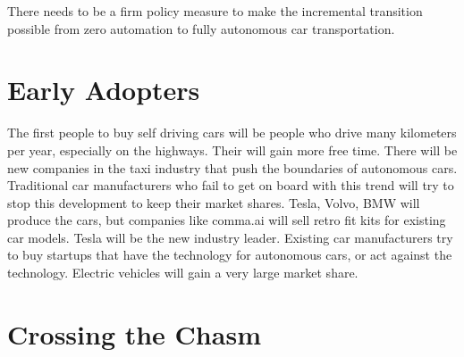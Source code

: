 \documentclass[a4paper]{article}
\begin{document}
There needs to be a firm policy measure to make the incremental transition possible from zero automation to fully autonomous car transportation.




\section{Early Adopters}
\label{sec:early-adopters}

The first people to buy self driving cars will be people who drive many kilometers per year, especially on the highways. Their will gain more free time.
There will be new companies in the taxi industry that push the boundaries of autonomous cars.
Traditional car manufacturers who fail to get on board with this trend will try to stop this development to keep their market shares.
Tesla, Volvo, BMW will produce the cars, but companies like comma.ai will sell retro fit kits for existing car models.
Tesla will be the new industry leader.
Existing car manufacturers try to buy startups that have the technology for autonomous cars, or act against the technology.
Electric vehicles will gain a very large market share.

\section{Crossing the Chasm}
\label{sec:crossing-the-chasm}



\end{document}
